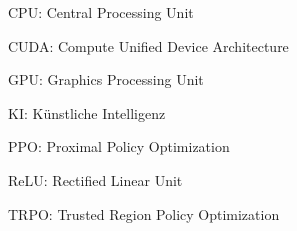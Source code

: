 
CPU: Central Processing Unit

CUDA: Compute Unified Device Architecture

GPU: Graphics Processing Unit

KI: Künstliche Intelligenz

PPO: Proximal Policy Optimization

ReLU: Rectified Linear Unit

TRPO: Trusted Region Policy Optimization
